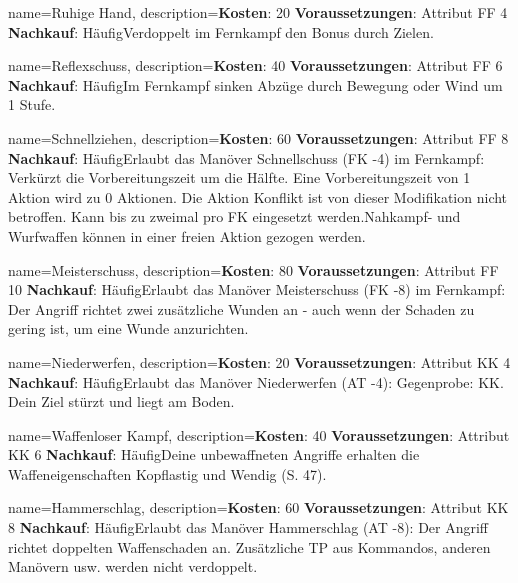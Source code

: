 {
    name={Ruhige Hand},
    description={\textbf{Kosten}: 20 \textbf{Voraussetzungen}: Attribut FF 4 \textbf{Nachkauf}: Häufig\newline Verdoppelt im Fernkampf den Bonus durch Zielen.}
}


{
    name={Reflexschuss},
    description={\textbf{Kosten}: 40 \textbf{Voraussetzungen}: Attribut FF 6 \textbf{Nachkauf}: Häufig\newline Im Fernkampf sinken Abzüge durch Bewegung oder Wind um 1 Stufe.}
}


{
    name={Schnellziehen},
    description={\textbf{Kosten}: 60 \textbf{Voraussetzungen}: Attribut FF 8 \textbf{Nachkauf}: Häufig\newline Erlaubt das Manöver Schnellschuss (FK -4) im Fernkampf: Verkürzt die Vorbereitungszeit um die Hälfte. Eine Vorbereitungszeit von 1 Aktion wird zu 0 Aktionen. Die Aktion Konflikt ist von dieser Modifikation nicht betroffen. Kann bis zu zweimal pro FK eingesetzt werden.\newline Nahkampf- und Wurfwaffen können in einer freien Aktion gezogen werden.}
}


{
    name={Meisterschuss},
    description={\textbf{Kosten}: 80 \textbf{Voraussetzungen}: Attribut FF 10 \textbf{Nachkauf}: Häufig\newline Erlaubt das Manöver Meisterschuss (FK -8) im Fernkampf: Der Angriff richtet zwei zusätzliche Wunden an - auch wenn der Schaden zu gering ist, um eine Wunde anzurichten.}
}


{
    name={Niederwerfen},
    description={\textbf{Kosten}: 20 \textbf{Voraussetzungen}: Attribut KK 4 \textbf{Nachkauf}: Häufig\newline Erlaubt das Manöver Niederwerfen (AT -4): Gegenprobe: KK. Dein Ziel stürzt und liegt am Boden.}
}


{
    name={Waffenloser Kampf},
    description={\textbf{Kosten}: 40 \textbf{Voraussetzungen}: Attribut KK 6 \textbf{Nachkauf}: Häufig\newline Deine unbewaffneten Angriffe erhalten die Waffeneigenschaften Kopflastig und Wendig (S. 47).}
}


{
    name={Hammerschlag},
    description={\textbf{Kosten}: 60 \textbf{Voraussetzungen}: Attribut KK 8 \textbf{Nachkauf}: Häufig\newline Erlaubt das Manöver Hammerschlag (AT -8): Der Angriff richtet doppelten Waffenschaden an. Zusätzliche TP aus Kommandos, anderen Manövern usw. werden nicht verdoppelt.}
}


